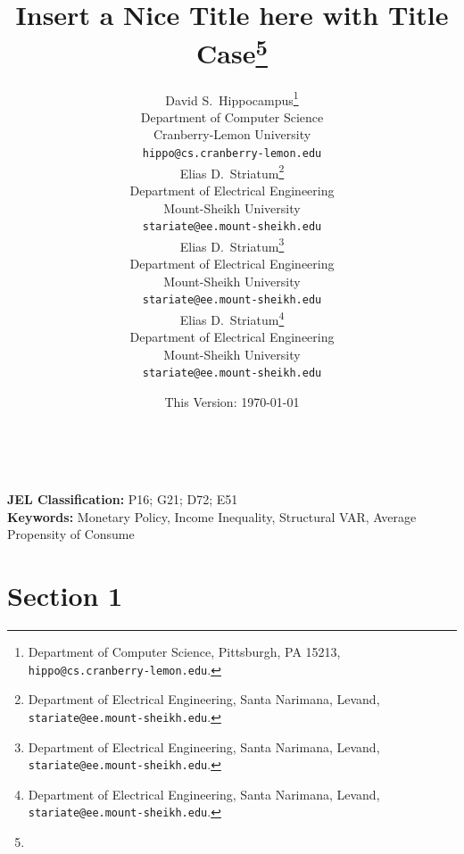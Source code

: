 \documentclass[11pt]{article}
\date{This Version: \today}
\title{Insert a Nice Title here with Title Case\thanks{\Acknowledgments}}
\author{
    {David S.~Hippocampus}\thanks{Department of Computer Science, Pittsburgh, PA 15213, \texttt{hippo@cs.cranberry-lemon.edu}.} \\
    Department of Computer Science\\
    Cranberry-Lemon University\\
    \texttt{hippo@cs.cranberry-lemon.edu} \\
    \And
    {Elias D.~Striatum}\thanks{Department of Electrical Engineering, Santa Narimana, Levand, \texttt{stariate@ee.mount-sheikh.edu}.} \\
    Department of Electrical Engineering\\
    Mount-Sheikh University\\
    \texttt{stariate@ee.mount-sheikh.edu} \\
    \AND
    {Elias D.~Striatum}\thanks{Department of Electrical Engineering, Santa Narimana, Levand, \texttt{stariate@ee.mount-sheikh.edu}.} \\
    Department of Electrical Engineering\\
    Mount-Sheikh University\\
    \texttt{stariate@ee.mount-sheikh.edu} \\
    \And
    {Elias D.~Striatum}\thanks{Department of Electrical Engineering, Santa Narimana, Levand, \texttt{stariate@ee.mount-sheikh.edu}.} \\
    Department of Electrical Engineering\\
    Mount-Sheikh University\\
    \texttt{stariate@ee.mount-sheikh.edu} \\
}
\begin{document}
\maketitle

\renewcommand{\thefootnote}{\arabic{footnote}}
\setcounter{footnote}{0}


\draftdisclaimer


\noindent \lipsum[10]\\

\vfill

{\noindent \textbf{JEL Classification:} P16; G21; D72; E51} \\
{\noindent \textbf{Keywords:} Monetary Policy, Income Inequality, Structural VAR, Average Propensity of Consume}\\

\newpage





\section{Section 1}
\end{document}
